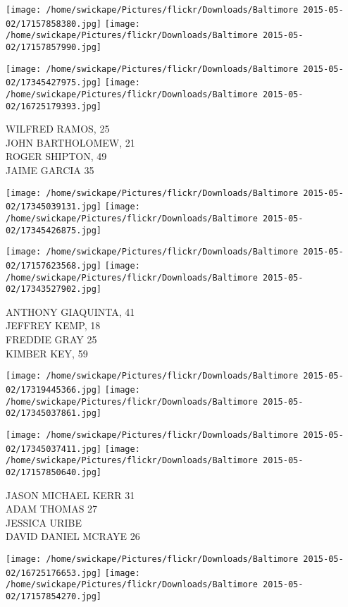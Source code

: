 \documentclass[10pt,letterpaper]{article}
\begin{document}
\texttt{[image: /home/swickape/Pictures/flickr/Downloads/Baltimore 2015-05-02/17157858380.jpg]}
\texttt{[image: /home/swickape/Pictures/flickr/Downloads/Baltimore 2015-05-02/17157857990.jpg]}

\texttt{[image: /home/swickape/Pictures/flickr/Downloads/Baltimore 2015-05-02/17345427975.jpg]}
\texttt{[image: /home/swickape/Pictures/flickr/Downloads/Baltimore 2015-05-02/16725179393.jpg]}

WILFRED RAMOS, 25\\
JOHN BARTHOLOMEW, 21\\
ROGER SHIPTON, 49\\
JAIME GARCIA 35\\
\pagebreak

\texttt{[image: /home/swickape/Pictures/flickr/Downloads/Baltimore 2015-05-02/17345039131.jpg]}
\texttt{[image: /home/swickape/Pictures/flickr/Downloads/Baltimore 2015-05-02/17345426875.jpg]}

\texttt{[image: /home/swickape/Pictures/flickr/Downloads/Baltimore 2015-05-02/17157623568.jpg]}
\texttt{[image: /home/swickape/Pictures/flickr/Downloads/Baltimore 2015-05-02/17343527902.jpg]}

ANTHONY GIAQUINTA, 41\\
JEFFREY KEMP, 18\\
FREDDIE GRAY 25\\
KIMBER KEY, 59\\
\pagebreak

\texttt{[image: /home/swickape/Pictures/flickr/Downloads/Baltimore 2015-05-02/17319445366.jpg]}
\texttt{[image: /home/swickape/Pictures/flickr/Downloads/Baltimore 2015-05-02/17345037861.jpg]}

\texttt{[image: /home/swickape/Pictures/flickr/Downloads/Baltimore 2015-05-02/17345037411.jpg]}
\texttt{[image: /home/swickape/Pictures/flickr/Downloads/Baltimore 2015-05-02/17157850640.jpg]}

JASON MICHAEL KERR 31\\
ADAM THOMAS 27\\
JESSICA URIBE\\
DAVID DANIEL MCRAYE 26\\
\pagebreak

\texttt{[image: /home/swickape/Pictures/flickr/Downloads/Baltimore 2015-05-02/16725176653.jpg]}
\texttt{[image: /home/swickape/Pictures/flickr/Downloads/Baltimore 2015-05-02/17157854270.jpg]}
\end{document}
